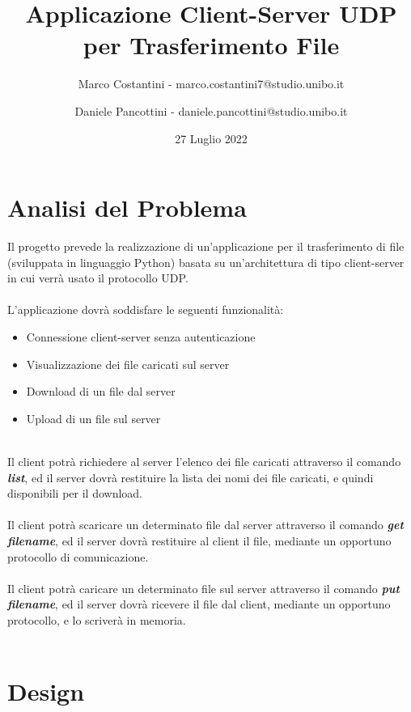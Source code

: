 \documentclass{article}
\title{Applicazione Client-Server UDP per Trasferimento File}
\author{Marco Costantini - marco.costantini7@studio.unibo.it \and Daniele Pancottini - daniele.pancottini@studio.unibo.it}
\date{27 Luglio 2022}
\begin{document}
\maketitle
\newpage

\tableofcontents

\newpage
\section{Analisi del Problema}


Il progetto prevede la realizzazione di un'applicazione per il trasferimento di file (sviluppata in linguaggio Python) basata su un'architettura di tipo client-server in cui verrà usato il protocollo UDP.\\\\
L'applicazione dovrà soddisfare le seguenti funzionalità:

	\begin{itemize}
		\item Connessione client-server senza autenticazione
		\item Visualizzazione dei file caricati sul server
		\item Download di un file dal server
		\item Upload di un file sul server
	\end{itemize}
\ \\
Il client potrà richiedere al server l'elenco dei file caricati attraverso il comando \textbf{\emph{list}}, ed il server dovrà restituire la lista dei nomi dei file caricati, e quindi disponibili per il download.\\\\
Il client potrà scaricare un determinato file dal server attraverso il comando \textbf{\emph{get filename}}, ed il server dovrà restituire al client il file, mediante un opportuno protocollo di comunicazione.\\\\
Il client potrà caricare un determinato file sul server attraverso il comando \textbf{\emph{put filename}}, ed il server dovrà ricevere il file dal client, mediante un opportuno protocollo, e lo scriverà in memoria.\\\\

\newpage
\section{Design}
\end{document}
